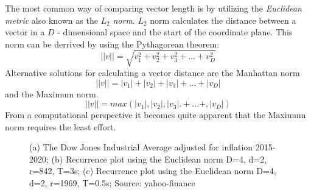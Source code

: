\documentclass[a4paper,12pt,fleqn]{article}
\begin{document}
The most common way of comparing vector length is by utilizing the \emph{Euclidean metric} also known as the $L_2$ \emph{norm}.
$L_2$ norm calculates the distance between a vector in a $D$ - dimensional space and the start of the coordinate plane.
This norm can be derrived by using the Pythagorean theorem:
\[
  ||v|| = \sqrt{v_1^2 + v_2^2 + v_3^2 + ... + v_D^2}
\]
Alternative solutions for calculating a vector distance are the Manhattan norm
\[
  ||v|| = |v_1| + |v_2| + |v_3| + ... + |v_D|
\]
and the Maximum norm.
\[
  ||v|| = max(|v_1|,|v_2|,|v_3|.+ ... +,|v_D|)
\]
From a computational perspective it becomes quite apparent that the Maximum norm requires the least effort.
\begin{figure}[ht!]
  \hspace{\fill}
  \hspace{\fill}
  \caption{\label{fig:theory_dji}(a) The Dow Jones Industrial Average adjusted for inflation 2015-2020; (b) Recurrence plot using the Euclidean norm D=4, d=2, r=842, T=3s; (c) Recurrence plot using the Euclidean norm D=4, d=2, r=1969, T=0.5s; Source: yahoo-finance~\cite{yahoo-finance}}
\end{figure}
\end{document}
